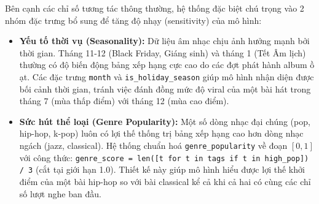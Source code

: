 \documentclass[12pt,a4paper]{report}
\begin{document}
Bên cạnh các chỉ số tương tác thông thường, hệ thống đặc biệt chú trọng vào 2 nhóm đặc trưng bổ sung để tăng độ nhạy (sensitivity) của mô hình:
\begin{itemize}[leftmargin=*]
    \item \textbf{Yếu tố thời vụ (Seasonality):} Dữ liệu âm nhạc chịu ảnh hưởng mạnh bởi thời gian. Tháng 11-12 (Black Friday, Giáng sinh) và tháng 1 (Tết Âm lịch) thường có độ biến động bảng xếp hạng cực cao do các đợt phát hành album ồ ạt. Các đặc trưng \texttt{month} và \texttt{is\_holiday\_season} giúp mô hình nhận diện được bối cảnh thời gian, tránh việc đánh đồng mức độ viral của một bài hát trong tháng 7 (mùa thấp điểm) với tháng 12 (mùa cao điểm).
    \item \textbf{Sức hút thể loại (Genre Popularity):} Một số dòng nhạc đại chúng (pop, hip-hop, k-pop) luôn có lợi thế thống trị bảng xếp hạng cao hơn dòng nhạc ngách (jazz, classical). Hệ thống chuẩn hoá \texttt{genre\_popularity} về đoạn $[0, 1]$ với công thức: \texttt{genre\_score = len([t for t in tags if t in high\_pop]) / 3} (cắt tại giới hạn 1.0). Thiết kế này giúp mô hình hiểu được lợi thế khởi điểm của một bài hip-hop so với bài classical kể cả khi cả hai có cùng các chỉ số lượt nghe ban đầu.
\end{itemize}
\end{document}
